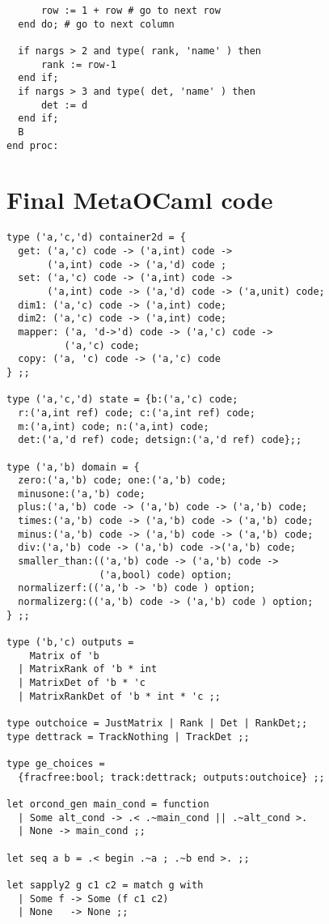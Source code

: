 \documentclass[11pt]{elsart}
\begin{document}
\begin{small}
\begin{verbatim}
      row := 1 + row # go to next row
  end do; # go to next column

  if nargs > 2 and type( rank, 'name' ) then
      rank := row-1
  end if;
  if nargs > 3 and type( det, 'name' ) then
      det := d
  end if;
  B
end proc:
\end{verbatim}
\end{small}
\section{Final MetaOCaml code}
\label{finalcode}
\begin{small}
\begin{verbatim}
type ('a,'c,'d) container2d = {
  get: ('a,'c) code -> ('a,int) code -> 
       ('a,int) code -> ('a,'d) code ;
  set: ('a,'c) code -> ('a,int) code -> 
       ('a,int) code -> ('a,'d) code -> ('a,unit) code;
  dim1: ('a,'c) code -> ('a,int) code;
  dim2: ('a,'c) code -> ('a,int) code;
  mapper: ('a, 'd->'d) code -> ('a,'c) code -> 
          ('a,'c) code;
  copy: ('a, 'c) code -> ('a,'c) code
} ;;

type ('a,'c,'d) state = {b:('a,'c) code; 
  r:('a,int ref) code; c:('a,int ref) code; 
  m:('a,int) code; n:('a,int) code;
  det:('a,'d ref) code; detsign:('a,'d ref) code};;

type ('a,'b) domain = {
  zero:('a,'b) code; one:('a,'b) code;
  minusone:('a,'b) code;
  plus:('a,'b) code -> ('a,'b) code -> ('a,'b) code; 
  times:('a,'b) code -> ('a,'b) code -> ('a,'b) code;
  minus:('a,'b) code -> ('a,'b) code -> ('a,'b) code; 
  div:('a,'b) code -> ('a,'b) code ->('a,'b) code;
  smaller_than:(('a,'b) code -> ('a,'b) code -> 
                ('a,bool) code) option;
  normalizerf:(('a,'b -> 'b) code ) option;
  normalizerg:(('a,'b) code -> ('a,'b) code ) option;
} ;;

type ('b,'c) outputs = 
    Matrix of 'b
  | MatrixRank of 'b * int
  | MatrixDet of 'b * 'c
  | MatrixRankDet of 'b * int * 'c ;;

type outchoice = JustMatrix | Rank | Det | RankDet;;
type dettrack = TrackNothing | TrackDet ;;

type ge_choices = 
  {fracfree:bool; track:dettrack; outputs:outchoice} ;;

let orcond_gen main_cond = function
  | Some alt_cond -> .< .~main_cond || .~alt_cond >.
  | None -> main_cond ;;

let seq a b = .< begin .~a ; .~b end >. ;;

let sapply2 g c1 c2 = match g with
  | Some f -> Some (f c1 c2)
  | None   -> None ;;


\end{verbatim}
\end{small}
\end{document}
